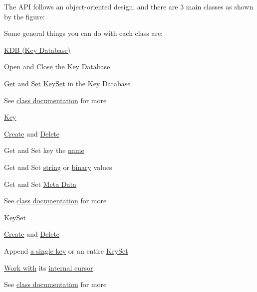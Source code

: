 The A\+P\+I follows an object-\/oriented design, and there are 3 main classes as shown by the figure\+:

 Some general things you can do with each class are\+:

\hyperlink{group__kdb}{K\+D\+B (Key Database)}


\begin{DoxyItemize}
\item \hyperlink{group__kdb_ga6808defe5870f328dd17910aacbdc6ca}{Open} and \hyperlink{group__kdb_gadb54dc9fda17ee07deb9444df745c96f}{Close} the Key Database
\item \hyperlink{group__kdb_ga28e385fd9cb7ccfe0b2f1ed2f62453a1}{Get} and \hyperlink{group__kdb_ga11436b058408f83d303ca5e996832bcf}{Set} \hyperlink{group__keyset}{Key\+Set} in the Key Database
\item See \hyperlink{group__kdb}{class documentation} for more
\end{DoxyItemize}

\hyperlink{group__key}{Key}
\begin{DoxyItemize}
\item \hyperlink{group__key_gad23c65b44bf48d773759e1f9a4d43b89}{Create} and \hyperlink{group__key_ga3df95bbc2494e3e6703ece5639be5bb1}{Delete}
\item Get and Set key the \hyperlink{group__keyname_ga7699091610e7f3f43d2949514a4b35d9}{name}
\item Get and Set \hyperlink{group__keyvalue_ga622bde1eb0e0c4994728331326340ef2}{string} or \hyperlink{group__keyvalue_gaa50a5358fd328d373a45f395fa1b99e7}{binary} values
\item Get and Set \hyperlink{group__keymeta}{Meta Data}
\item See \hyperlink{group__key}{class documentation} for more
\end{DoxyItemize}

\hyperlink{group__keyset}{Key\+Set}
\begin{DoxyItemize}
\item \hyperlink{group__keyset_ga671e1aaee3ae9dc13b4834a4ddbd2c3c}{Create} and \hyperlink{group__keyset_ga27e5c16473b02a422238c8d970db7ac8}{Delete}
\item Append \hyperlink{group__keyset_gaa5a1d467a4d71041edce68ea7748ce45}{a single key} or an entire \hyperlink{group__keyset_ga21eb9c3a14a604ee3a8bdc779232e7b7}{Key\+Set}
\item \hyperlink{group__keyset_ga317321c9065b5a4b3e33fe1c399bcec9}{Work with} its \hyperlink{group__keyset_ga4287b9416912c5f2ab9c195cb74fb094}{internal cursor}
\item See \hyperlink{group__keyset}{class documentation} for more
\end{DoxyItemize}

